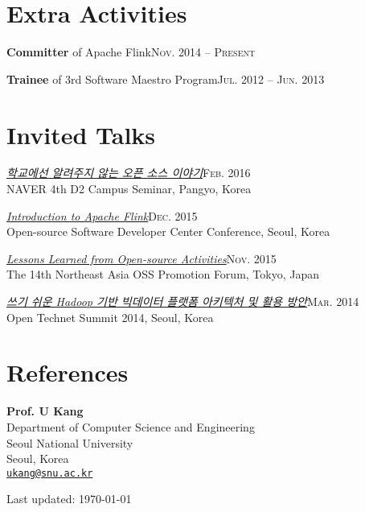 \documentclass[11pt,a4paper]{article}
\renewenvironment{itemize}{
  \begin{list}{}{
    \setlength{\leftmargin}{1.5em}
    \setlength{\itemsep}{0.5em}
    \setlength{\parskip}{0pt}
    \setlength{\parsep}{0.25em}
  }
}{
  \end{list}
}
\begin{document}
\section*{Extra Activities}
\begin{itemize}
	\setlength\itemsep{0.1em}
  \item \textbf{Committer} of Apache Flink\hfill\textsc{Nov. 2014 -- Present}
  \item \textbf{Trainee} of 3rd Software Maestro Program\hfill\textsc{Jul. 2012 -- Jun. 2013}
\end{itemize}

\section*{Invited Talks}
\begin{itemize}
  \item \href{http://j.mp/d2-campus-seminar-4th-park}{\textit{학교에선 알려주지 않는 오픈 소스 이야기}}\hfill\textsc{Feb. 2016}\\
        NAVER 4th D2 Campus Seminar, Pangyo, Korea
  \item \href{http://j.mp/ossdevconf-2015-park}{\textit{Introduction to Apache Flink}}\hfill\textsc{Dec. 2015}\\
        Open-source Software Developer Center Conference, Seoul, Korea
  \item \href{http://j.mp/cjkossforum-2015-park}{\textit{Lessons Learned from Open-source Activities}}\hfill\textsc{Nov. 2015}\\
        The 14th Northeast Asia OSS Promotion Forum, Tokyo, Japan
  \item \href{http://j.mp/ots-2014-park}{\textit{쓰기 쉬운 Hadoop 기반 빅데이터 플랫폼 아키텍처 및 활용 방안}}\hfill\textsc{Mar. 2014}\\
        Open Technet Summit 2014, Seoul, Korea
\end{itemize}

\section*{References}
\begin{itemize}
  \item \textbf{Prof. U Kang}\\
        Department of Computer Science and Engineering\\
        Seoul National University\\
        Seoul, Korea\\
        \href{mailto:ukang@snu.ac.kr}{\tt ukang@snu.ac.kr}
\end{itemize}

\bigskip
{\small Last updated: \today}
\end{document}
